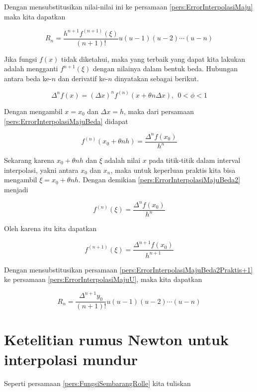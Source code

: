 Dengan mensubstitusikan nilai-nilai ini ke persamaan \ref{pers:ErrorInterpolasiMaju} maka kita dapatkan

\begin{equation}\label{pers:ErrorInterpolasiMajuU}
R_n = \frac{h^{n+1}f^{(n+1)}(\xi)}{(n+1)!}u(u-1)(u-2)\cdots(u-n)
\end{equation}

Jika fungsi $f(x)$ tidak diketahui, maka yang terbaik yang dapat kita lakukan adalah mengganti $f^{n+1}(\xi)$ dengan nilainya dalam bentuk beda. Hubungan antara beda ke-$n$ dan derivatif ke-$n$ dinyatakan sebagai berikut.

\begin{equation}\label{pers:ErrorInterpolasiMajuBeda}
\Delta^n f(x) = (\Delta x)^n f^{(n)}(x+\theta n \Delta x),~~0<\phi<1
\end{equation}

Dengan mengambil $x=x_0$ dan $\Delta x = h$, maka dari persamaan \ref{pers:ErrorInterpolasiMajuBeda} didapat

\begin{equation}\label{pers:ErrorInterpolasiMajuBeda2}
f^{(n)}(x_0 + \theta nh) = \frac{\Delta^n f(x_0)}{h^n}
\end{equation}

Sekarang karena $x_0 + \theta nh$ dan $\xi$ adalah nilai $x$ pada titik-titik dalam interval interpolasi, yakni antara $x_0$ dan $x_n$, maka untuk keperluan praktis kita bisa mengambil $\xi = x_0 + \theta nh$. Dengan demikian \ref{pers:ErrorInterpolasiMajuBeda2} menjadi

\begin{equation}
f^{(n)}(\xi) = \frac{\Delta^nf(x_0)}{h^n}
\end{equation}

Oleh karena itu kita dapatkan

\begin{equation}\label{pers:ErrorInterpolasiMajuBeda2Praktis+1}
f^{(n+1)}(\xi) = \frac{\Delta^{n+1}f(x_0)}{h^{n+1}}
\end{equation}

Dengan mensubstitusikan persamaan \ref{pers:ErrorInterpolasiMajuBeda2Praktis+1} ke persamaan \ref{pers:ErrorInterpolasiMajuU}, maka kita dapatkan

\begin{equation}\label{pers:ErrorInterpolasiMajuUPraktis}
R_n = \frac{\Delta^{n+1}y_0}{(n+1)!} u(u-1)(u-2)\cdots(u-n)
\end{equation}

\section{Ketelitian rumus Newton untuk interpolasi mundur}
Seperti persamaan \ref{pers:FungsiSembarangRolle} kita tuliskan

